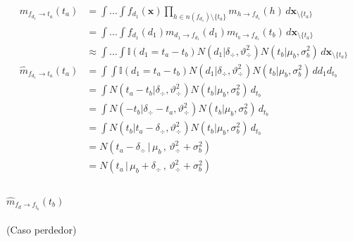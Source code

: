 \documentclass[11pt,twoside,spanish]{report} %
\begin{document}
\begin{equation}\label{eq:^m_fd_ta}
	\begin{split}
		m_{f_{d_1} \rightarrow t_a}(t_a) &= \int \dots \int f_{d_1}(\textbf{x}) \prod_{h \in n(f_{d_1}) \setminus \{t_a\} } m_{h \rightarrow f_{d_1}}(h) \, d\textbf{x}_{\setminus \{t_a\} }  \\
		&= \int \dots \int f_{d_1}(d_1)m_{d_1 \rightarrow f_{d_1}}(d_1) m_{t_b \rightarrow f_{d_1}}(t_b)  \, d\textbf{x}_{\setminus \{t_a\} }  \\
		&\approx  \int \dots \int \mathbb{I}(d_1 = t_a - t_b) N(d_1 | \delta_{\div}, \vartheta_{\div}^2) N(t_b | \mu_b , \sigma_b^2 )  \, d\textbf{x}_{\setminus \{t_a\} } \\[0.1cm]
		\widehat{m}_{f_{d_1} \rightarrow t_a}(t_a)  & = \int \int \mathbb{I}(d_1 = t_a - t_b) N(d_1 | \delta_{\div}, \vartheta_{\div}^2) N(t_b | \mu_b , \sigma_b^2 )  \, d{d_1} d_{t_b} \\
		& = \int  N(t_a - t_b | \delta_{\div}, \vartheta_{\div}^2) N(t_b | \mu_b , \sigma_b^2 )  \, d_{t_b} \\
		&=\int  N( - t_b | \delta_{\div} - t_a, \vartheta_{\div}^2) N(t_b | \mu_b , \sigma_b^2 )  \, d_{t_b} \\
		& = \int  N( t_b | t_a - \delta_{\div}, \vartheta_{\div}^2) N(t_b | \mu_b , \sigma_b^2 )  \,  d_{t_b} \\
		&=N(t_a - \delta_{\div} \, | \, \mu_b \, , \, \vartheta_{\div}^2 + \sigma_b^2) \\
		&= N(t_a \, | \, \mu_b + \delta_{\div} \, , \, \vartheta_{\div}^2 + \sigma_b^2) \\
	\end{split}
\end{equation}


\paragraph{$\widehat{m}_{f_d \rightarrow f_{t_b}}(t_b)$} (Caso perdedor)
\end{document}
